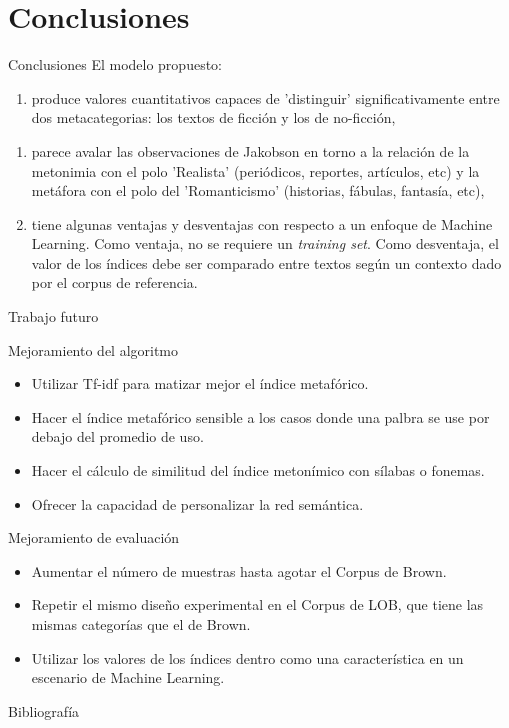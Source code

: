 \documentclass[presentation]{beamer}
\begin{document}
\section{Conclusiones}
\label{sec:org4b62e72}
\begin{frame}[label={sec:org61b44f8}]{Conclusiones}
El modelo propuesto:

\begin{enumerate}
\item produce valores cuantitativos capaces de 'distinguir'
significativamente entre dos metacategorias: los textos de
ficción y los de no-ficción,
\end{enumerate}
\begin{enumerate}
\item parece avalar las observaciones de Jakobson en torno a la relación
de la metonimia con el polo 'Realista' (periódicos, reportes,
artículos, etc) y la metáfora con el polo del 'Romanticismo'
(historias, fábulas, fantasía, etc),

\item tiene algunas ventajas y desventajas con respecto a un enfoque de
Machine Learning. Como ventaja, no se requiere un \emph{training
set}. Como desventaja, el valor de los índices debe ser comparado
entre textos según un contexto dado por el corpus de referencia.
\end{enumerate}
\end{frame}

\begin{frame}[label={sec:orgbf723da}]{Trabajo futuro}
\begin{block}{Mejoramiento del algoritmo}
\begin{itemize}
\item Utilizar Tf-idf para matizar mejor el índice metafórico.
\item Hacer el índice metafórico sensible a los casos donde una palbra se use por debajo del promedio de uso.
\item Hacer el cálculo de similitud del índice metonímico con sílabas o fonemas.
\item Ofrecer la capacidad de personalizar la red semántica.
\end{itemize}
\end{block}

\begin{block}{Mejoramiento de evaluación}
\begin{itemize}
\item Aumentar el número de muestras hasta agotar el Corpus de Brown.
\item Repetir el mismo diseño experimental en el Corpus de LOB, que tiene las mismas categorías que el de Brown.
\item Utilizar los valores de los índices dentro como una característica en un escenario de Machine Learning.
\end{itemize}
\end{block}
\end{frame}

\begin{frame}[label={sec:orgf317906}]{Bibliografía}


\end{frame}
\end{document}
